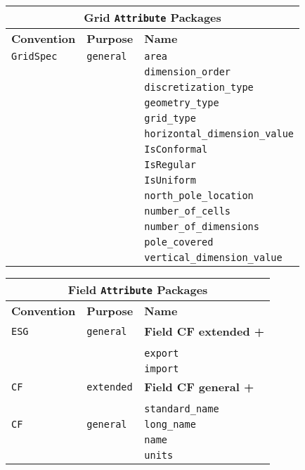 \vspace{18pt}

\begin{tabular}{|p{4cm}|p{4cm}|p{6cm}|}
\hline
\multicolumn{3}{|c|}{{\bf \large Grid {\tt Attribute} Packages}} \\
\hline\hline
{\bf Convention} & {\bf Purpose} & {\bf Name} \\
\hline\hline
{\tt GridSpec} & {\tt general} & {\tt area}  \\
 & & {\tt dimension\_order} \\ 
 & & {\tt discretization\_type} \\ 
 & & {\tt geometry\_type} \\ 
 & & {\tt grid\_type} \\ 
 & & {\tt horizontal\_dimension\_value} \\ 
 & & {\tt IsConformal} \\ 
 & & {\tt IsRegular} \\ 
 & & {\tt IsUniform} \\ 
 & & {\tt north\_pole\_location} \\ 
 & & {\tt number\_of\_cells} \\ 
 & & {\tt number\_of\_dimensions} \\ 
 & & {\tt pole\_covered} \\ 
 & & {\tt vertical\_dimension\_value} \\ 
\hline
\end{tabular}
\label{GridAttributePackages}

\vspace{18pt}

\begin{tabular}{|p{4cm}|p{4cm}|p{6cm}|}
\hline
\multicolumn{3}{|c|}{{\bf \large Field {\tt Attribute} Packages}} \\
\hline\hline
{\bf Convention} & {\bf Purpose} & {\bf Name} \\
\hline\hline
{\tt ESG} & {\tt general} & {\bf Field CF extended +} \\
& & \\
& & {\tt export}  \\
 & & {\tt import} \\ 
\hline
{\tt CF} & {\tt extended} & {\bf Field CF general +} \\
& & \\
& & {\tt standard\_name}\\ 
\hline
{\tt CF} & {\tt general} & {\tt long\_name}\\
     & & {\tt name} \\
     & & {\tt units}  \\
\hline
\end{tabular}
\label{FieldAttributePackages}

